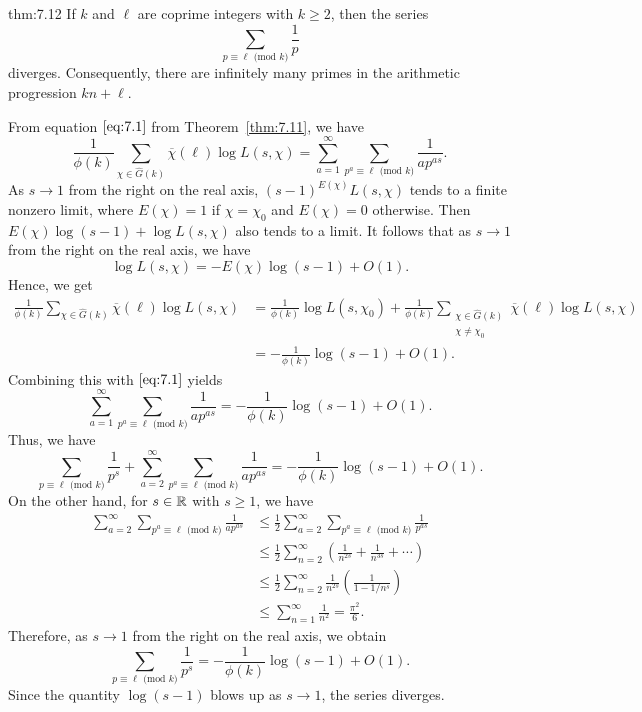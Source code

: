 \begin{theo}{thm:7.12}
    If $k$ and $\ell$ are coprime integers with $k \geq 2$, then the series 
    \[ \sum_{p\equiv\ell\text{ (mod }k)} \frac{1}{p} \] 
    diverges. Consequently, there are infinitely many primes in the 
    arithmetic progression $kn + \ell$. 
\end{theo}
\begin{pf}
    From equation $\eqref{eq:7.1}$ from Theorem~\ref{thm:7.11}, we have 
    \[ \frac{1}{\phi(k)} \sum_{\chi\in\hat G(k)} \overline\chi(\ell) 
    \log L(s, \chi) = \sum_{a=1}^\infty \sum_{p^a\equiv\ell\text{ (mod }k)}
    \frac{1}{ap^{as}}. \] 
    As $s \to 1$ from the right on the real axis, $(s-1)^{E(\chi)} L(s, \chi)$ 
    tends to a finite nonzero limit, where $E(\chi) = 1$ if $\chi = \chi_0$ 
    and $E(\chi) = 0$ otherwise. Then $E(\chi) \log(s-1) + 
    \log L(s, \chi)$ also tends to a limit. It follows that as $s \to 1$ 
    from the right on the real axis, we have 
    \[ \log L(s, \chi) = -E(\chi)\log(s-1) + O(1). \] 
    Hence, we get 
    \begin{align*}
        \frac{1}{\phi(k)} \sum_{\chi\in\hat G(k)} \overline\chi(\ell) \log L(s, \chi)
        &= \frac{1}{\phi(k)} \log L(s, \chi_0) + \frac{1}{\phi(k)} 
        \sum_{\substack{\chi\in\hat G(k) \\ \chi\neq\chi_0}} \overline\chi(\ell) 
        \log L(s, \chi) \\
        &= -\frac{1}{\phi(k)} \log(s-1) + O(1). 
    \end{align*}
    Combining this with $\eqref{eq:7.1}$ yields 
    \[ \sum_{a=1}^\infty \sum_{p^a\equiv\ell\text{ (mod }k)} \frac{1}{ap^{as}} 
    = -\frac{1}{\phi(k)} \log(s-1) + O(1). \] 
    Thus, we have 
    \[ \sum_{p\equiv\ell\text{ (mod }k)} \frac{1}{p^s} + 
    \sum_{a=2}^\infty \sum_{p^a\equiv\ell\text{ (mod }k)} \frac{1}{ap^{as}} 
    = -\frac{1}{\phi(k)} \log(s-1) + O(1). \] 
    On the other hand, for $s \in \mathbb{R}$ with $s \geq 1$, we have 
    \begin{align*}
        \sum_{a=2}^\infty \sum_{p^a\equiv\ell\text{ (mod }k)} \frac{1}{ap^{as}} 
        &\leq \frac12 \sum_{a=2}^\infty \sum_{p^a\equiv\ell\text{ (mod }k)} \frac{1}{p^{as}} \\ 
        &\leq \frac12 \sum_{n=2}^\infty \left( \frac{1}{n^{2s}} + \frac{1}{n^{3s}} + \cdots \right) \\ 
        &\leq \frac12 \sum_{n=2}^\infty \frac{1}{n^{2s}} \left( \frac{1}{1 - 1/n^s} \right) \\ 
        &\leq \sum_{n=1}^\infty \frac{1}{n^2} = \frac{\pi^2}{6}. 
    \end{align*}
    Therefore, as $s \to 1$ from the right on the real axis, we obtain 
    \[ \sum_{p\equiv\ell\text{ (mod }k)} \frac{1}{p^s} = -\frac{1}{\phi(k)} \log(s-1) + O(1). \] 
    Since the quantity $\log(s-1)$ blows up as $s \to 1$, the series diverges. 
\end{pf}